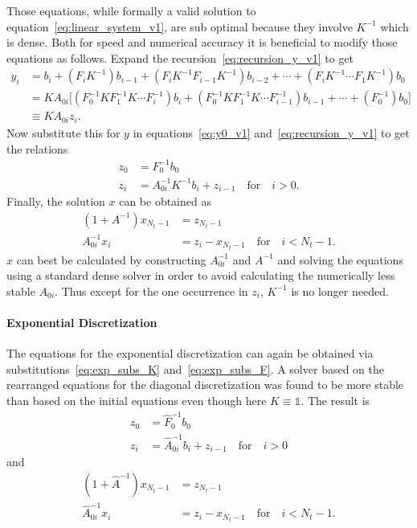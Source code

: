 \documentclass[a4paper, fleqn, twoside, notitlepage]{scrartcl}
\begin{document}
\noindent
Those equations, while formally a valid solution to equation~\eqref{eq:linear_system_v1}, are sub optimal because they involve $K^{-1}$ which is dense.
Both for speed and numerical accuracy it is beneficial to modify those equations as follows.
Expand the recursion~\eqref{eq:recursion_y_v1} to get
\begin{align}
  y_i &= b_i + (F_i K^{-1}) b_{i-1} + (F_{i} K^{-1} F_{i-1}K^{-1}) b_{i-2} + \cdots + (F_i K^{-1} \cdots F_1 K^{-1}) b_0\\
      &= K A_{0i} \big[(F_0^{-1} K F_1^{-1} K \cdots F_i^{-1}) b_i + (F_0^{-1} K F_1^{-1} K \cdots F_{i-1}^{-1}) b_{i-1} + \cdots + (F_0^{-1}) b_0\big]\\
  &\equiv K A_{0i} z_i.
\end{align}
Now substitute this for $y$ in equations~\eqref{eq:y0_v1} and~\eqref{eq:recursion_y_v1} to get the relations
\begin{align}
  z_0 &= F_0^{-1} b_0\\
  z_i &= A_{0i}^{-1} K^{-1} b_i + z_{i-1} \quad \text{for} \quad i > 0.
\end{align}
Finally, the solution $x$ can be obtained as
\begin{align}
  (1 + A^{-1}) x_{N_t-1} &= z_{N_t-1}\\
  A_{0i}^{-1} x_i &= z_i - x_{N_t-1} \quad \text{for} \quad i < N_t-1.
\end{align}
$x$ can best be calculated by constructing $A_{0i}^{-1}$ and $A^{-1}$ and solving the equations using a standard dense solver in order to avoid calculating the numerically less stable $A_{0i}$.
Thus except for the one occurrence in $z_i$, $K^{-1}$ is no longer needed.

\paragraph{Exponential Discretization}
The equations for the exponential discretization can again be obtained via substitutions~\eqref{eq:exp_subs_K} and~\eqref{eq:exp_subs_F}.
A solver based on the rearranged equations for the diagonal discretization was found to be more stable than based on the initial equations even though here $K \equiv \mathds{1}$.
The result is
\begin{align}
  z_0 &= \hat{F}_0^{-1} b_0\\
  z_i &= \hat{A}_{0i}^{-1} b_i + z_{i-1} \quad \text{for} \quad i > 0
\end{align}
and
\begin{align}
  (1 + \hat{A}^{-1}) x_{N_t-1} &= z_{N_t-1}\\
  \hat{A}_{0i}^{-1} x_i &= z_i - x_{N_t-1} \quad \text{for} \quad i < N_t-1.
\end{align}
\end{document}
